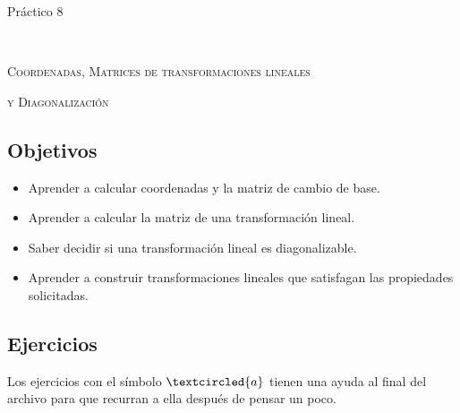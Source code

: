 \documentclass[12pt]{amsart}
\begin{document}



\centerline{\Large{Pr\' actico 8}}

\

\centerline{\textsc{Coordenadas, Matrices de transformaciones lineales}}
\centerline{\textsc{y Diagonalizaci\'on}}

\bigbreak

\subsection*{Objetivos}

\begin{itemize}
 \item Aprender a calcular coordenadas y la matriz de cambio de base.
 \item Aprender a calcular la matriz de una transformaci\'on lineal.
 \item Saber decidir si una transformaci\'on lineal es diagonalizable.
 \item Aprender a construir transformaciones lineales que satisfagan las propiedades \linebreak solicitadas.
\end{itemize}


\bigbreak


\subsection*{Ejercicios} Los ejercicios con el s\'imbolo $\textcircled{a}$ tienen una ayuda al final del archivo para que recurran a ella despu\'es de pensar un poco.

\
\end{document}
